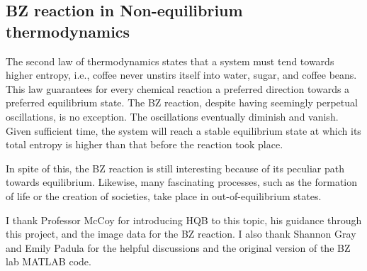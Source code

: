 \documentclass[twocolumn,amsmath,amssymb,aps]{revtex4}
\begin{document}
\subsection{BZ reaction in Non-equilibrium thermodynamics}

The second law of thermodynamics states that a system must tend towards higher entropy, i.e., coffee never unstirs itself into water, sugar, and coffee beans. This law guarantees for every chemical reaction a preferred direction towards a preferred equilibrium state. The BZ reaction, despite having seemingly perpetual oscillations, is no exception. The oscillations eventually diminish and vanish. Given sufficient time, the system will reach a stable equilibrium state at which its total entropy is higher than that before the reaction took place. 

In spite of this, the BZ reaction is still interesting because of its peculiar path towards equilibrium. Likewise, many fascinating processes, such as the formation of life or the creation of societies, take place in out-of-equilibrium states. \cite{ball1999self}




\begin{acknowledgments}
I thank Professor McCoy for introducing HQB to this topic, his guidance through this project, and the image data for the BZ reaction. I also thank Shannon Gray and Emily Padula for the helpful discussions and the original version of the BZ lab MATLAB code.  
\end{acknowledgments}



\end{document}
